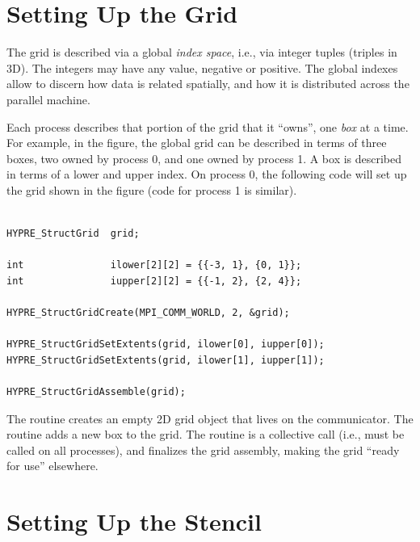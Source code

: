 
\section{Setting Up the Grid}
\label{Setting Up the Grid}

The grid is described via a global {\em index space}, i.e., via
integer tuples (triples in 3D).  The integers may have any value,
negative or positive.  The global indexes allow \hypre{} to discern
how data is related spatially, and how it is distributed across the
parallel machine.

Each process describes that portion of the grid that it ``owns'', one
{\em box} at a time.  For example, in the figure, the global grid can
be described in terms of three boxes, two owned by process 0, and one
owned by process 1.  A box is described in terms of a lower and upper
index.  On process 0, the following code will set up the grid shown in
the figure (code for process 1 is similar).
\begin{display}
\begin{verbatim}

HYPRE_StructGrid  grid;

int               ilower[2][2] = {{-3, 1}, {0, 1}};
int               iupper[2][2] = {{-1, 2}, {2, 4}};

HYPRE_StructGridCreate(MPI_COMM_WORLD, 2, &grid);

HYPRE_StructGridSetExtents(grid, ilower[0], iupper[0]);
HYPRE_StructGridSetExtents(grid, ilower[1], iupper[1]);

HYPRE_StructGridAssemble(grid);

\end{verbatim}
\end{display}

The  routine creates an empty 2D grid
object that lives on the  communicator.  The
 routine adds a new box to the grid.
The  routine is a collective call
(i.e., must be called on all processes), and finalizes the grid
assembly, making the grid ``ready for use'' elsewhere.


\section{Setting Up the Stencil}
\label{Setting Up the Stencil}

